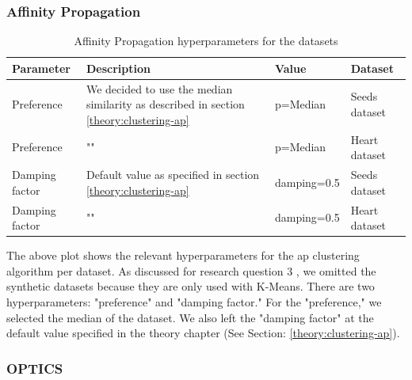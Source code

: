 \subsubsection{Affinity Propagation}
\begin{table}[h]
  \begin{tabular}{|l|p{6cm}|l|l|}
    \hline
    Parameter      & Description                                                                                & Value       & Dataset       \\
    \hline
    Preference     & We decided to use the median similarity as described in section \ref{theory:clustering-ap} & p=Median    & Seeds dataset \\
    \hline
    Preference     & ""                                                                                         & p=Median    & Heart dataset \\
    \hline

    Damping factor & Default value as specified in section \ref{theory:clustering-ap}                           & damping=0.5 & Seeds dataset \\
    \hline
    Damping factor & ""                                                                                         & damping=0.5 & Heart dataset \\
    \hline
  \end{tabular}
  \caption{Affinity Propagation hyperparameters for the datasets}
  \label{tab:ap-formula-sklearn}
\end{table}
The above plot shows the relevant hyperparameters for the \gls{ap} clustering algorithm per dataset.
As discussed for research question 3 , we omitted the synthetic datasets because they are only used with K-Means.
There are two hyperparameters: "preference" and "damping factor."
For the "preference," we selected the median of the dataset.
We also left the "damping factor" at the default value specified in the theory chapter (See Section: \ref{theory:clustering-ap}).
\subsubsection{OPTICS}

